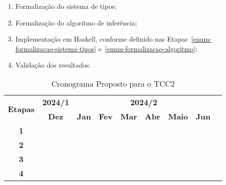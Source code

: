 \begin{enumerate}
	\item Formalização do sistema de tipos;\label{enum-formalizacao-sistema-tipos}
	\item Formalização do algoritmo de inferência;\label{enum-formalizacao-algoritmo}
	\item Implementação em Haskell, conforme definido nas Etapas~\ref{enum-formalizacao-sistema-tipos} e~\ref{enum-formalizacao-algoritmo};
	\item Validação dos resultados.
\end{enumerate}

\begin{table}[htbp]
	\centering
	\begin{tabular}{|c|c|c|c|c|c|c|c|c|}
		\hline
		\multirow{2}{*}{\textbf{\small{Etapas}}} & \textbf{\small{2024/1}} & \multicolumn{6}{c|}{\textbf{\small{2024/2}}}                                                                                                \\
		\cline{2-8}
		                                         & \textbf{Dez}            & \textbf{Jan}                                 & \textbf{Fev}     & \textbf{Mar}     & \textbf{Abr}     & \textbf{Maio}    & \textbf{Jun}     \\
		\hline
		\textbf{\small{1}}                       & \cellcolor{gray}        & \cellcolor{gray}                             & \cellcolor{gray} &                  &                  &                  &                  \\
		\hline
		\textbf{\small{2}}                       &                         &                                              & \cellcolor{gray} & \cellcolor{gray} &                  &                  &                  \\
		\hline
		\textbf{\small{3}}                       &                         &                                              &                  & \cellcolor{gray} & \cellcolor{gray} & \cellcolor{gray} &                  \\
		\hline
		\textbf{\small{4}}                       &                         &                                              &                  &                  &                  & \cellcolor{gray} & \cellcolor{gray} \\
		\hline
	\end{tabular}
	\caption{Cronograma Proposto para o TCC2}
\end{table}
% 
% 
% 
